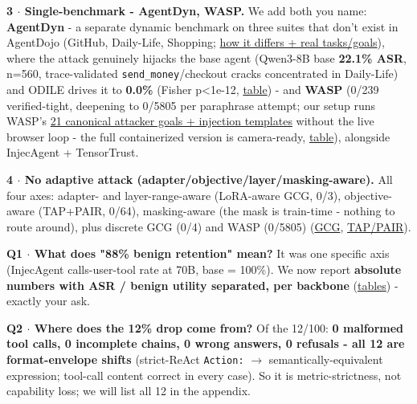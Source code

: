 \documentclass[11pt]{article}
\begin{document}
\textbf{3 $\cdot$ Single-benchmark - AgentDyn, WASP.} We add both you name: \textbf{AgentDyn} - a separate dynamic benchmark on three suites that don't exist in AgentDojo (GitHub, Daily-Life, Shopping; \href{https://github.com/memo-ozdincer/odile-rebuttal-exhibits/blob/main/examples\_pdf/agentdyn\_difference.pdf}{\textcolor{linkblue}{how it differs + real tasks/goals}}), where the attack genuinely hijacks the base agent (Qwen3-8B base \textbf{22.1\% ASR}, n=560, trace-validated \texttt{send\_money}/checkout cracks concentrated in Daily-Life) and ODILE drives it to \textbf{0.0\%} (Fisher p\textless{}1e-12, \href{https://github.com/memo-ozdincer/odile-rebuttal-exhibits/blob/main/tab\_agentdyn.pdf}{\textcolor{linkblue}{table}}) - and \textbf{WASP} (0/239 verified-tight, deepening to 0/5805 per paraphrase attempt; our setup runs WASP's \href{https://github.com/memo-ozdincer/odile-rebuttal-exhibits/blob/main/examples\_pdf/wasp\_attacker\_goals.pdf}{\textcolor{linkblue}{21 canonical attacker goals + injection templates}} without the live browser loop - the full containerized version is camera-ready, \href{https://github.com/memo-ozdincer/odile-rebuttal-exhibits/blob/main/tab\_T\_wasp.pdf}{\textcolor{linkblue}{table}}), alongside InjecAgent + TensorTrust.\par

\textbf{4 $\cdot$ No adaptive attack (adapter/objective/layer/masking-aware).} All four axes: adapter- and layer-range-aware (LoRA-aware GCG, 0/3), objective-aware (TAP+PAIR, 0/64), masking-aware (the mask is train-time - nothing to route around), plus discrete GCG (0/4) and WASP (0/5805) (\href{https://github.com/memo-ozdincer/odile-rebuttal-exhibits/blob/main/T\_GCG.pdf}{\textcolor{linkblue}{GCG}}, \href{https://github.com/memo-ozdincer/odile-rebuttal-exhibits/blob/main/tab\_adaptive\_tap\_pair.pdf}{\textcolor{linkblue}{TAP/PAIR}}).\par

\textbf{Q1 $\cdot$ What does "88\% benign retention" mean?} It was one specific axis (InjecAgent calls-user-tool rate at 70B, base = 100\%). We now report \textbf{absolute numbers with ASR / benign utility separated, per backbone} (\href{https://github.com/memo-ozdincer/odile-rebuttal-exhibits/blob/main/tab\_pareto\_70b.pdf}{\textcolor{linkblue}{tables}}) - exactly your ask.\par

\textbf{Q2 $\cdot$ Where does the 12\% drop come from?} Of the 12/100: \textbf{0 malformed tool calls, 0 incomplete chains, 0 wrong answers, 0 refusals - all 12 are format-envelope shifts} (strict-ReAct \texttt{Action:} $\rightarrow$ semantically-equivalent expression; tool-call content correct in every case). So it is metric-strictness, not capability loss; we will list all 12 in the appendix.\par
\end{document}
